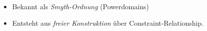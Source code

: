 \documentclass[handout,10pt,xcolor={dvipsnames},fleqn]{beamer}
\newcommand{\cemph}[1]{\alert{#1}}
\begin{document}
\begin{frame}
\begin{itemize}
\item Bekannt als \emph{Smyth-Ordnung} (Powerdomains) \hfill \cite[Ch.~9]{amadio-curien:1998}
\item Entsteht aus \emph{freier Konstruktion} über Constraint-Relationship.\hfill \cite{knapp-schiendorfer2014ictai}
\end{itemize}

%

\end{frame}
\end{document}
